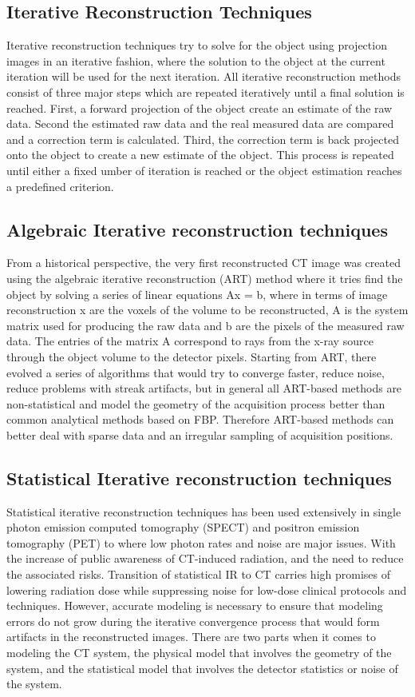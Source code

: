 \subsection{Iterative Reconstruction Techniques}
Iterative reconstruction techniques try to solve for the object using projection images in an iterative fashion, where the solution to the object at the current iteration will be used for the next iteration.  All iterative reconstruction methods consist of three major steps which are repeated iteratively until a final solution is reached.  First, a forward projection of the object create an estimate of the raw data.  Second the estimated raw data and the real measured data are compared and a correction term is calculated.  Third, the correction term is back projected onto the object to create a new estimate of the object.  This process is repeated until either a fixed umber of iteration is reached or the object estimation reaches a predefined criterion.

\subsection{Algebraic Iterative reconstruction techniques}
From a historical perspective, the very first reconstructed CT image was created using the algebraic iterative reconstruction (ART) method where it tries find the object by solving a series of linear equations Ax = b, where in terms of image reconstruction x are the voxels of the volume to be reconstructed, A is the system matrix used for producing the raw data and b are the pixels of the measured raw data.  The entries of the matrix A correspond to rays from the x-ray source through the object volume to the detector pixels.  Starting from ART, there evolved a series of algorithms that would try to converge faster, reduce noise, reduce problems with streak artifacts, but in general all ART-based methods are non-statistical and model the geometry of the acquisition process better than common analytical methods based on FBP.  Therefore ART-based methods can better deal with sparse data and an irregular sampling of acquisition positions\citep{Beister2012}.

\subsection{Statistical Iterative reconstruction techniques}
Statistical iterative reconstruction techniques has been used extensively in single photon emission computed tomography (SPECT) and positron emission tomography (PET) to where low photon rates and noise are major issues.  With the increase of public awareness of CT-induced radiation, and the need to reduce the associated risks. Transition of statistical IR to CT carries high promises of lowering radiation dose while suppressing noise for low-dose clinical protocols and techniques.  However, accurate modeling is necessary to ensure that modeling errors do not grow during the iterative convergence process that would form artifacts in the reconstructed images.  There are two parts when it comes to modeling the CT system, the physical model that involves the geometry of the system, and the statistical model that involves the detector statistics or noise of the system.  

